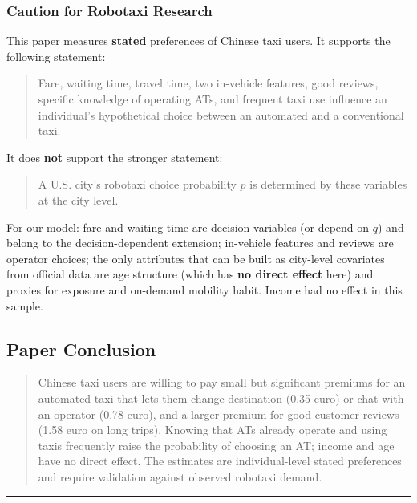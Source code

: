 \documentclass[10pt,a4paper]{article}
\begin{document}
\begin{mdframed}[linecolor=red!60,linewidth=2pt]
\hypertarget{caution-for-robotaxi-research-4}{%
\subsubsection{Caution for Robotaxi Research}\label{caution-for-robotaxi-research-4}}

This paper measures \textbf{stated} preferences of Chinese taxi users. It supports the following statement:

\begin{quote}
Fare, waiting time, travel time, two in-vehicle features, good reviews, specific knowledge of operating ATs, and frequent taxi use influence an individual's hypothetical choice between an automated and a conventional taxi.
\end{quote}

It does \textbf{not} support the stronger statement:

\begin{quote}
A U.S. city's robotaxi choice probability $p$ is determined by these variables at the city level.
\end{quote}

For our model: fare and waiting time are decision variables (or depend on $q$) and belong to the decision-dependent extension; in-vehicle features and reviews are operator choices; the only attributes that can be built as city-level covariates from official data are age structure (which has \textbf{no direct effect} here) and proxies for exposure and on-demand mobility habit. Income had no effect in this sample.

\hypertarget{paper-conclusion-4}{%
\subsection{Paper Conclusion}\label{paper-conclusion-4}}

\begin{quote}
Chinese taxi users are willing to pay small but significant premiums for an automated taxi that lets them change destination (0.35 euro) or chat with an operator (0.78 euro), and a larger premium for good customer reviews (1.58 euro on long trips). Knowing that ATs already operate and using taxis frequently raise the probability of choosing an AT; income and age have no direct effect. The estimates are individual-level stated preferences and require validation against observed robotaxi demand.
\end{quote}

\begin{center}\rule{0.5\linewidth}{0.5pt}\end{center}


\end{mdframed}
\end{document}
